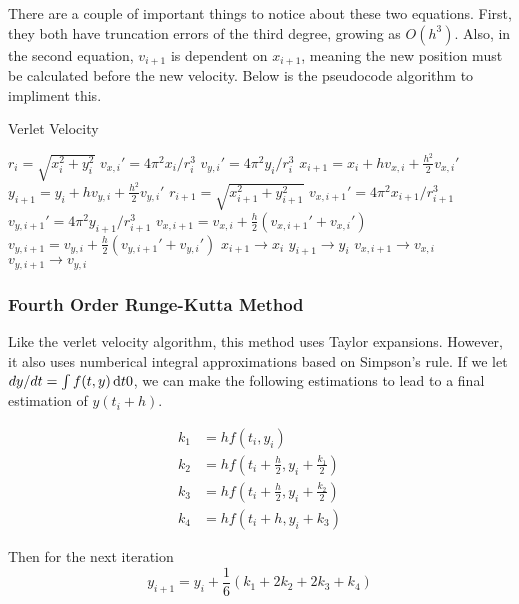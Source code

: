 \documentclass[11pt]{article}
\begin{document}
    There are a couple of important things to notice about these two equations. First, they both have truncation errors of the third degree, growing as $O(h^3)$. Also, in the second equation, $v_{i+1}$ is dependent on $x_{i+1}$, meaning the new position must be calculated before the new velocity. Below is the pseudocode algorithm to impliment this.

    \begin{algorithm}[H]
    \caption{Verlet Velocity}
    \label{Verlet Velocity}
    \begin{algorithmic}[1]
    \State $r_i = \sqrt{x_i^2+y_i^2}$
    \State $v_{x,i}' = 4\pi^2x_i/r_i^3$
    \State $v_{y,i}' = 4\pi^2y_i/r_i^3$
    \State $x_{i+1} = x_i + hv_{x,i}+ \frac{h^2}{2}v_{x,i}'$
    \State $y_{i+1} = y_i + hv_{y,i}+ \frac{h^2}{2}v_{y,i}'$
    \State $r_{i+1} = \sqrt{x_{i+1}^2+y_{i+1}^2}$
    \State $v_{x,i+1}' = 4\pi^2 x_{i+1}/r_{i+1}^3$
    \State $v_{y,i+1}' = 4\pi^2 y_{i+1}/r_{i+1}^3$
    \State $v_{x,i+1} = v_{x,i} + \frac{h}{2}(v_{x,i+1}'+v_{x,i}')$
    \State $v_{y,i+1} = v_{y,i} + \frac{h}{2}(v_{y,i+1}'+v_{y,i}')$
    \State $x_{i+1} \to x_i$
    \State $y_{i+1} \to y_i$
    \State $v_{x,i+1} \to v_{x,i}$
    \State $v_{y,i+1} \to v_{y,i}$
    \EndFor
    \EndFunction
    \end{algorithmic}
    \end{algorithm}

\subsubsection{Fourth Order Runge-Kutta Method}
    
    Like the verlet velocity algorithm, this method uses Taylor expansions. However, it also uses numberical integral approximations based on Simpson's rule. If we let $dy/dt = \int f(t,y) \dif{t}0$, we can make the following estimations to lead to a final estimation of $y(t_i+h)$.

    \begin{align}
    k_1 &= hf(t_i,y_i) \\
    k_2 &= hf(t_i + \frac{h}{2}, y_i+\frac{k_1}{2}) \\
    k_3 &= hf(t_i + \frac{h}{2}, y_i+\frac{k_2}{2}) \\
    k_4 &= hf(t_i + h, y_i+ k_3) 
    \end{align}

    Then for the next iteration
    \begin{equation} y_{i+1} = y_i + \frac{1}{6}(k_1 + 2k_2 + 2k_3 + k_4) \end{equation}
\end{document}
